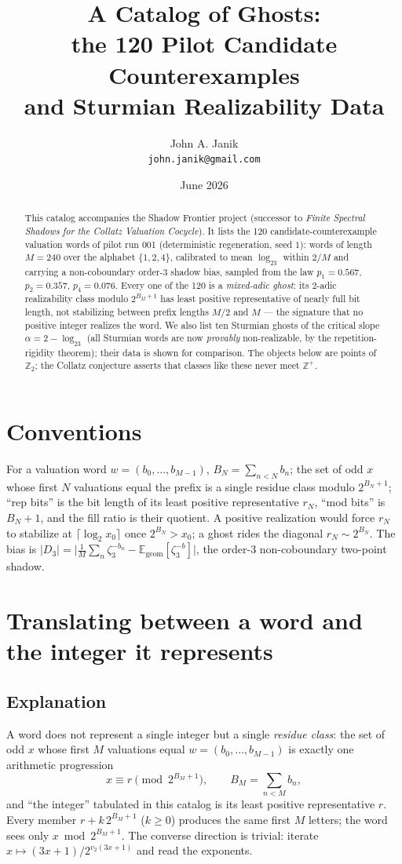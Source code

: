 \documentclass[10pt]{article}
\title{A Catalog of Ghosts:\\ the 120 Pilot Candidate Counterexamples\\ and Sturmian Realizability Data}
\author{John A. Janik\\ \small\texttt{john.janik@gmail.com}}
\date{June 2026}
\begin{document}
\maketitle

\begin{abstract}
This catalog accompanies the Shadow Frontier project (successor to
\emph{Finite Spectral Shadows for the Collatz Valuation Cocycle}). It lists
the 120 candidate-counterexample valuation words of pilot run 001
(deterministic regeneration, seed $1$): words of length $M=240$ over the
alphabet $\{1,2,4\}$, calibrated to mean $\log_23$ within $2/M$ and
carrying a non-coboundary order-$3$ shadow bias, sampled from the law
$p_1=0.567$, $p_2=0.357$, $p_4=0.076$. Every one of the 120 is a
\emph{mixed-adic ghost}: its $2$-adic realizability class modulo
$2^{B_M+1}$ has least positive representative of nearly full bit length,
not stabilizing between prefix lengths $M/2$ and $M$ --- the signature
that no positive integer realizes the word. We also list ten Sturmian
ghosts of the critical slope $\alpha=2-\log_23$ (all Sturmian words are
now \emph{provably} non-realizable, by the repetition-rigidity theorem);
their data is shown for comparison. The objects below are points of
$\mathbb{Z}_2$; the Collatz conjecture asserts that classes like these
never meet $\mathbb{Z}^{+}$.
\end{abstract}

\section{Conventions}
For a valuation word $w=(b_0,\dots,b_{M-1})$, $B_N=\sum_{n<N}b_n$;
the set of odd $x$ whose first $N$ valuations equal the prefix is a single
residue class modulo $2^{B_N+1}$; ``rep bits'' is the bit length of its
least positive representative $r_N$, ``mod bits'' is $B_N+1$, and the fill
ratio is their quotient. A positive realization would force
$r_N$ to stabilize at $\lceil\log_2 x_0\rceil$ once $2^{B_N}>x_0$; a ghost
rides the diagonal $r_N\sim 2^{B_N}$. The bias is
$|D_3|=\bigl|\frac1M\sum_n \zeta_3^{-b_n}-\mathbb{E}_{\mathrm{geom}}
[\zeta_3^{-b}]\bigr|$, the order-3 non-coboundary two-point shadow.

\section{Translating between a word and the integer it represents}

\subsection*{Explanation}
A word does not represent a single integer but a single \emph{residue
class}: the set of odd $x$ whose first $M$ valuations equal
$w=(b_0,\dots,b_{M-1})$ is exactly one arithmetic progression
\[
x\equiv r \pmod{2^{B_M+1}},\qquad B_M=\textstyle\sum_{n<M}b_n ,
\]
and ``the integer'' tabulated in this catalog is its least positive
representative $r$. Every member $r+k\,2^{B_M+1}$ ($k\ge0$) produces the
same first $M$ letters; the word sees only $x\bmod 2^{B_M+1}$. The
converse direction is trivial: iterate
$x\mapsto(3x+1)/2^{v_2(3x+1)}$ and read the exponents.
\end{document}
